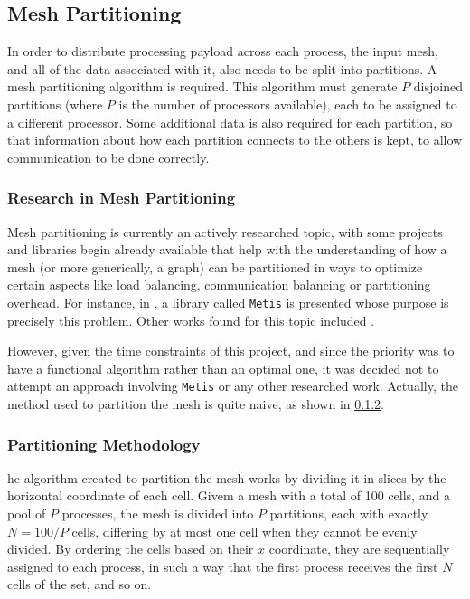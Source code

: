 \subsection{Mesh Partitioning}
\label{subsec:mpi:partitioning}

In order to distribute processing payload across each process, the input mesh, and all of the data associated with it, also needs to be split into partitions. A mesh partitioning algorithm is required. This algorithm must generate $P$ disjoined partitions (where $P$ is the number of processors available), each to be assigned to a different processor. Some additional data is also required for each partition, so that information about how each partition connects to the others is kept, to allow communication to be done correctly.

\subsubsection{Research in Mesh Partitioning}
\label{subsubsec:mpi:partitioning:research}

Mesh partitioning is currently an actively researched topic, with some projects and libraries begin already available that help with the understanding of how a mesh (or more generically, a graph) can be partitioned in ways to optimize certain aspects like load balancing, communication balancing or partitioning overhead. For instance, in \cite{metis}, a library called \texttt{Metis} is presented whose purpose is precisely this problem. Other works found for this topic included \cite{gilbert1995, walshaw2000}.

However, given the time constraints of this project, and since the priority was to have a functional algorithm rather than an optimal one, it was decided not to attempt an approach involving \texttt{Metis} or any other researched work. Actually, the method used to partition the mesh is quite naive, as shown in \cref{subsubsec:mpi:partitioning:method}.

\subsubsection{Partitioning Methodology}
\label{subsubsec:mpi:partitioning:method}

he algorithm created to partition the mesh works by dividing it in slices by the horizontal coordinate of each cell. Givem a mesh with a total of 100 cells, and a pool of $P$ processes, the mesh is divided into $P$ partitions, each with exactly $N=100/P$ cells, differing by at most one cell when they cannot be evenly divided. By ordering the cells based on their $x$ coordinate, they are sequentially assigned to each process, in such a way that the first process receives the first $N$ cells of the set, and so on.

